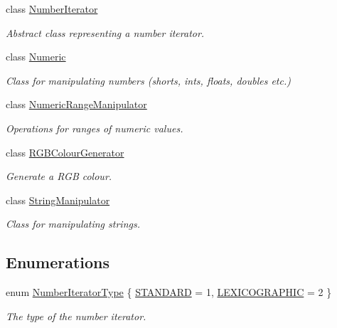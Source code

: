 \begin{DoxyCompactItemize}
class \hyperlink{classmultiscale_1_1NumberIterator}{\-Number\-Iterator}
\begin{DoxyCompactList}\small\item\em \-Abstract class representing a number iterator. \end{DoxyCompactList}\item 
class \hyperlink{classmultiscale_1_1Numeric}{\-Numeric}
\begin{DoxyCompactList}\small\item\em \-Class for manipulating numbers (shorts, ints, floats, doubles etc.) \end{DoxyCompactList}\item 
class \hyperlink{classmultiscale_1_1NumericRangeManipulator}{\-Numeric\-Range\-Manipulator}
\begin{DoxyCompactList}\small\item\em \-Operations for ranges of numeric values. \end{DoxyCompactList}\item 
class \hyperlink{classmultiscale_1_1RGBColourGenerator}{\-R\-G\-B\-Colour\-Generator}
\begin{DoxyCompactList}\small\item\em \-Generate a \-R\-G\-B colour. \end{DoxyCompactList}\item 
class \hyperlink{classmultiscale_1_1StringManipulator}{\-String\-Manipulator}
\begin{DoxyCompactList}\small\item\em \-Class for manipulating strings. \end{DoxyCompactList}\end{DoxyCompactItemize}
\subsection*{\-Enumerations}
\begin{DoxyCompactItemize}
\item 
enum \hyperlink{namespacemultiscale_a6ef911f4d48a4bf5e657c237ec169ff5}{\-Number\-Iterator\-Type} \{ \hyperlink{namespacemultiscale_a6ef911f4d48a4bf5e657c237ec169ff5aa048887eb0360a4b70dff5452133f42e}{\-S\-T\-A\-N\-D\-A\-R\-D} =  1, 
\hyperlink{namespacemultiscale_a6ef911f4d48a4bf5e657c237ec169ff5a2cba3a0174cc5c1d555ee13dcf6cda15}{\-L\-E\-X\-I\-C\-O\-G\-R\-A\-P\-H\-I\-C} =  2
 \}
\begin{DoxyCompactList}\small\item\em \-The type of the number iterator. \end{DoxyCompactList}\end{DoxyCompactItemize}
